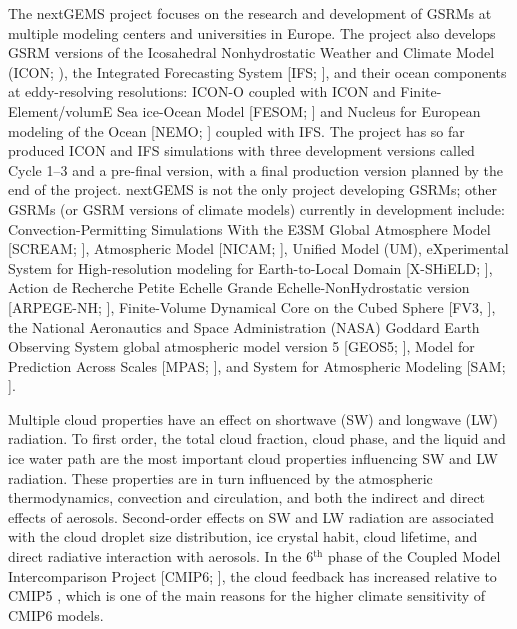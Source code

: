 \documentclass[draft]{agujournal2019}
\begin{document}
The nextGEMS project \cite{nextgems} focuses on the research and development of GSRMs at multiple modeling centers and universities in Europe. The project also develops GSRM versions of the Icosahedral Nonhydrostatic Weather and Climate Model (ICON; ), the Integrated Forecasting System [IFS; ], and their ocean components at eddy-resolving resolutions: ICON-O \cite{korn2022} coupled with ICON and Finite-Element/volumE Sea ice-Ocean Model [FESOM; ] and Nucleus for European modeling of the Ocean [NEMO; ] coupled with IFS. The project has so far produced ICON and IFS simulations with three development versions called Cycle 1--3 and a pre-final version, with a final production version planned by the end of the project. nextGEMS is not the only project developing GSRMs; other GSRMs (or GSRM versions of climate models) currently in development include: Convection-Permitting Simulations With the E3SM Global Atmosphere Model [SCREAM; ], Atmospheric Model [NICAM; ], Unified Model (UM), eXperimental System for High-resolution modeling for Earth-to-Local Domain [X-SHiELD; ], Action de Recherche Petite Echelle Grande Echelle-NonHydrostatic version [ARPEGE-NH; ], Finite-Volume Dynamical Core on the Cubed Sphere [FV3, ], the National Aeronautics and Space Administration (NASA) Goddard Earth Observing System global atmospheric model version 5 [GEOS5; ], Model for Prediction Across Scales [MPAS; ], and System for Atmospheric Modeling [SAM; ].

Multiple cloud properties have an effect on shortwave (SW) and longwave (LW) radiation. To first order, the total cloud fraction, cloud phase, and the liquid and ice water path are the most important cloud properties influencing SW and LW radiation. These properties are in turn influenced by the atmospheric thermodynamics, convection and circulation, and both the indirect and direct effects of aerosols. Second-order effects on SW and LW radiation are associated with the cloud droplet size distribution, ice crystal habit, cloud lifetime, and direct radiative interaction with aerosols. In the 6$^\mathrm{th}$ phase of the Coupled Model Intercomparison Project [CMIP6; ], the cloud feedback has increased relative to CMIP5 \cite{zelinka2020}, which is one of the main reasons for the higher climate sensitivity of CMIP6 models.
\end{document}
